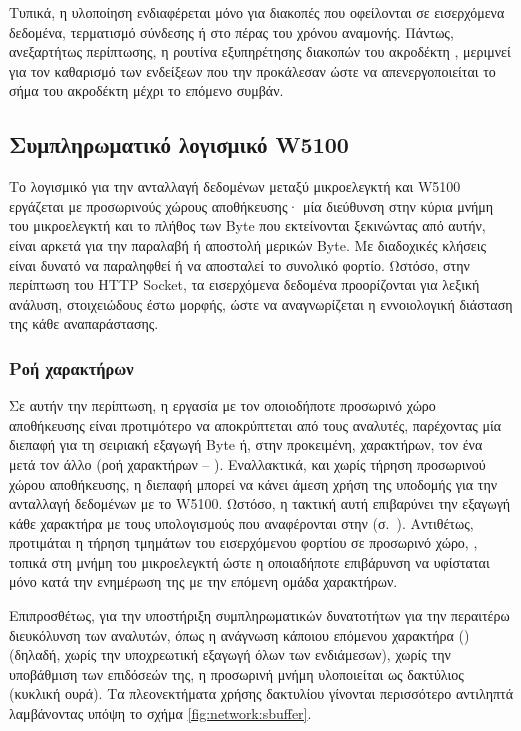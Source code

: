 Τυπικά, η υλοποίηση ενδιαφέρεται μόνο για διακοπές που οφείλονται σε εισερχόμενα
δεδομένα, τερματισμό σύνδεσης ή στο πέρας του χρόνου αναμονής. Πάντως,
ανεξαρτήτως περίπτωσης, η ρουτίνα εξυπηρέτησης διακοπών του ακροδέκτη
, μεριμνεί για τον καθαρισμό των ενδείξεων που την προκάλεσαν ώστε να
απενεργοποιείται το σήμα του ακροδέκτη μέχρι το επόμενο συμβάν.


\subsection{Συμπληρωματικό λογισμικό W5100}
\label{subsec:network:utilities}

Το λογισμικό για την ανταλλαγή δεδομένων μεταξύ μικροελεγκτή και W5100 εργάζεται
με προσωρινούς χώρους αποθήκευσης· μία διεύθυνση στην κύρια μνήμη του
μικροελεγκτή και το πλήθος των Byte που εκτείνονται ξεκινώντας από αυτήν, είναι
αρκετά για την παραλαβή ή αποστολή μερικών Byte. Με διαδοχικές κλήσεις είναι
δυνατό να παραληφθεί ή να αποσταλεί το συνολικό φορτίο. Ωστόσο, στην περίπτωση
του HTTP Socket, τα εισερχόμενα δεδομένα προορίζονται για λεξική ανάλυση,
στοιχειώδους έστω μορφής, ώστε να αναγνωρίζεται η εννοιολογική διάσταση της κάθε
αναπαράστασης.


\subsubsection{Ροή χαρακτήρων}
\label{ssubsec:network:sbuffer}

Σε αυτήν την περίπτωση, η εργασία με τον οποιοδήποτε προσωρινό χώρο αποθήκευσης
είναι προτιμότερο να αποκρύπτεται από τους αναλυτές, παρέχοντας μία διεπαφή για
τη σειριακή εξαγωγή Byte ή, στην προκειμένη, χαρακτήρων, τον ένα μετά τον άλλο
(ροή χαρακτήρων -- ).
Εναλλακτικά, και χωρίς τήρηση προσωρινού χώρου αποθήκευσης, η διεπαφή μπορεί να
κάνει άμεση χρήση της υποδομής για την ανταλλαγή δεδομένων με το W5100. Ωστόσο,
η τακτική αυτή επιβαρύνει την εξαγωγή κάθε χαρακτήρα με τους υπολογισμούς που
αναφέρονται στην 
(σ.~\pageref{ssubsec:network:rx-tx-buffer}). Αντιθέτως, προτιμάται η τήρηση
τμημάτων του εισερχόμενου φορτίου σε προσωρινό χώρο, , τοπικά στη
μνήμη του μικροελεγκτή ώστε η οποιαδήποτε επιβάρυνση να υφίσταται μόνο κατά την
ενημέρωση της  με την επόμενη ομάδα χαρακτήρων.

Επιπροσθέτως, για την υποστήριξη συμπληρωματικών δυνατοτήτων για την περαιτέρω
διευκόλυνση των αναλυτών, όπως η ανάγνωση κάποιου επόμενου χαρακτήρα () (δηλαδή, χωρίς την υποχρεωτική εξαγωγή όλων των ενδιάμεσων), χωρίς την
υποβάθμιση των επιδόσεών της, η προσωρινή μνήμη υλοποιείται ως δακτύλιος
(κυκλική ουρά). Τα πλεονεκτήματα χρήσης δακτυλίου γίνονται περισσότερο αντιληπτά
λαμβάνοντας υπόψη το σχήμα \ref{fig:network:sbuffer}.


